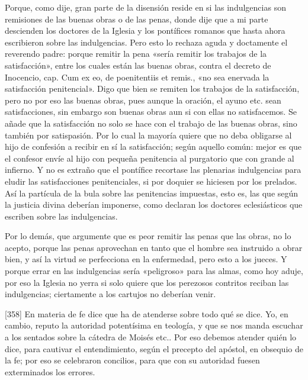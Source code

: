 Porque, como dije, gran parte de la disensión reside en si las indulgencias son remisiones de las buenas obras o de las penas, donde dije que a mi parte descienden los doctores de la Iglesia y los pontífices romanos que hasta ahora escribieron sobre las indulgencias. Pero esto lo rechaza aguda y doctamente el reverendo padre: porque remitir la pena «sería remitir los trabajos de la satisfacción», entre los cuales están las buenas obras, contra el decreto de Inocencio, cap. Cum ex eo, de poenitentiis et remis., «no sea enervada la satisfacción penitencial». Digo que bien se remiten los trabajos de la satisfacción, pero no por eso las buenas obras, pues aunque la oración, el ayuno etc. sean satisfacciones, sin embargo son buenas obras aun si con ellas no satisfacemos. Se añade que la satisfacción no solo se hace con el trabajo de las buenas obras, sino también por satispasión. Por lo cual la mayoría quiere que no deba obligarse al hijo de confesión a recibir en sí la satisfacción; según aquello común: mejor es que el confesor envíe al hijo con pequeña penitencia al purgatorio que con grande al infierno. Y no es extraño que el pontífice recortase las plenarias indulgencias para eludir las satisfacciones penitenciales, si por doquier se hiciesen por los prelados. Así la partícula de la bula sobre las penitencias impuestas, esto es, las que según la justicia divina deberían imponerse, como declaran los doctores eclesiásticos que escriben sobre las indulgencias.

Por lo demás, que argumente que es peor remitir las penas que las obras, no lo acepto, porque las penas aprovechan en tanto que el hombre sea instruido a obrar bien, y así la virtud se perfecciona en la enfermedad, pero esto a los jueces. Y porque errar en las indulgencias sería «peligroso» para las almas, como hoy aduje, por eso la Iglesia no yerra si solo quiere que los perezosos contritos reciban las indulgencias; ciertamente a los cartujos no deberían venir.

[358] En materia de fe dice que ha de atenderse sobre todo qué se dice. Yo, en cambio, reputo la autoridad potentísima en teología, y que se nos manda escuchar a los sentados sobre la cátedra de Moisés etc.. Por eso debemos atender quién lo dice, para cautivar el entendimiento, según el precepto del apóstol, en obsequio de la fe; por eso se celebraron concilios, para que con su autoridad fuesen exterminados los errores.

